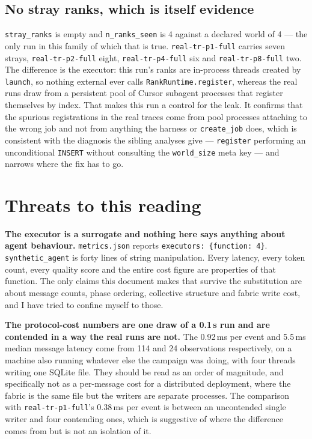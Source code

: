 \documentclass[11pt]{article}
\begin{document}
\subsection*{No stray ranks, which is itself evidence}

\texttt{stray\_ranks} is empty and \texttt{n\_ranks\_seen} is 4 against a declared world of 4 ---
the only run in this family of which that is true. \texttt{real-tr-p1-full} carries seven strays,
\texttt{real-tr-p2-full} eight, \texttt{real-tr-p4-full} six and \texttt{real-tr-p8-full} two. The
difference is the executor: this run's ranks are in-process threads created by \texttt{launch},
so nothing external ever calls \texttt{RankRuntime.register}, whereas the real runs draw from a
persistent pool of Cursor subagent processes that register themselves by index. That makes this
run a control for the leak. It confirms that the spurious registrations in the real traces come
from pool processes attaching to the wrong job and not from anything the harness or
\texttt{create\_job} does, which is consistent with the diagnosis the sibling analyses give ---
\texttt{register} performing an unconditional \texttt{INSERT} without consulting the
\texttt{world\_size} meta key --- and narrows where the fix has to go.

\section{Threats to this reading}

\textbf{The executor is a surrogate and nothing here says anything about agent behaviour.}
\texttt{metrics.json} reports \texttt{executors: \{function: 4\}}. \texttt{synthetic\_agent} is
forty lines of string manipulation. Every latency, every token count, every quality score and the
entire cost figure are properties of that function. The only claims this document makes that
survive the substitution are about message counts, phase ordering, collective structure and
fabric write cost, and I have tried to confine myself to those.

\textbf{The protocol-cost numbers are one draw of a 0.1\,s run and are contended in a way the
real runs are not.} The 0.92\,ms per event and 5.5\,ms median message latency come from 114 and 24
observations respectively, on a machine also running whatever else the campaign was doing, with
four threads writing one SQLite file. They should be read as an order of magnitude, and
specifically not as a per-message cost for a distributed deployment, where the fabric is the same
file but the writers are separate processes. The comparison with \texttt{real-tr-p1-full}'s
0.38\,ms per event is between an uncontended single writer and four contending ones, which is
suggestive of where the difference comes from but is not an isolation of it.
\end{document}
